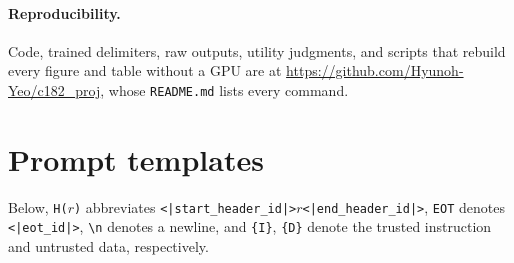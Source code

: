\documentclass{article}
\begin{document}
\paragraph{Reproducibility.} Code, trained delimiters, raw outputs, utility judgments, and scripts that rebuild every figure and table without a GPU are at \url{https://github.com/Hyunoh-Yeo/c182_proj}, whose \texttt{README.md} lists every command.

{\small


}

\appendix

\section{Prompt templates}
\label{app:templates}
{\sloppy Below, \texttt{H(}$r$\texttt{)} abbreviates \texttt{<|start\_\allowbreak header\_\allowbreak id|>}$r$\texttt{<|end\_\allowbreak header\_\allowbreak id|>}, \texttt{EOT} denotes \texttt{<|eot\_id|>}, \texttt{\textbackslash n} denotes a newline, and \texttt{\{I\}}, \texttt{\{D\}} denote the trusted instruction and untrusted data, respectively.\par}
\end{document}
